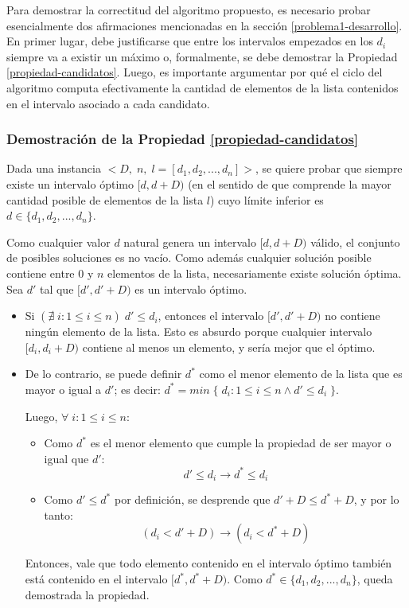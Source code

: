 Para demostrar la correctitud del algoritmo propuesto, es necesario probar esencialmente dos afirmaciones mencionadas en la sección \ref{problema1-desarrollo}. En primer lugar, debe justificarse que entre los intervalos empezados en los $d_i$ siempre va a existir un máximo o, formalmente, se debe demostrar la Propiedad \ref{propiedad-candidatos}. Luego, es importante argumentar por qué el ciclo del algoritmo computa efectivamente la cantidad de elementos de la lista contenidos en el intervalo asociado a cada candidato.

\subsubsection{Demostración de la Propiedad \ref{propiedad-candidatos}}

Dada una instancia $<D,\;n,\;l = [d_1, d_2, ..., d_n]>$, se quiere probar que siempre existe un intervalo óptimo $[d, d + D)$ (en el sentido de que comprende la mayor cantidad posible de elementos de la lista $l$) cuyo límite inferior es $d \in \{d_1,d_2,...,d_n\}$.

Como cualquier valor $d$ natural genera un intervalo $[d, d + D)$ válido, el conjunto de posibles soluciones es no vacío. Como además cualquier solución posible contiene entre 0 y $n$ elementos de la lista, necesariamente existe solución óptima. Sea $d'$ tal que $[d', d' + D)$ es un intervalo óptimo.

\begin{itemize}
  \item Si $(\nexists\;i : 1 \leq i \leq n)\;d' \leq d_i$, entonces el intervalo $[d', d' + D)$ no contiene ningún elemento de la lista. Esto es absurdo porque cualquier intervalo $[d_i, d_i + D)$ contiene al menos un elemento, y sería mejor que el óptimo.
  \item De lo contrario, se puede definir $d^*$ como el menor elemento de la lista que es mayor o igual a $d'$; es decir: $d^* = min\;\{\;d_i : 1 \leq i \leq n \land d' \leq d_i\;\}$.

  Luego, $\forall\;i : 1 \leq i \leq n$:
  
  \begin{itemize}
    \item Como $d^*$ es el menor elemento que cumple la propiedad de ser mayor o igual que $d'$:
    $$d' \leq d_i \rightarrow d^*\leq d_i$$
    \item Como $d' \leq d^*$ por definición, se desprende que $d' + D \leq d^* + D$, y por lo tanto:
    $$(d_i < d' + D) \rightarrow (d_i < d^* + D)$$
  \end{itemize}
  Entonces, vale que todo elemento contenido en el intervalo óptimo también está contenido en el intervalo $[d^*, d^* + D)$. Como $d^* \in \{d_1,d_2,...,d_n\}$, queda demostrada la propiedad.
\end{itemize}


